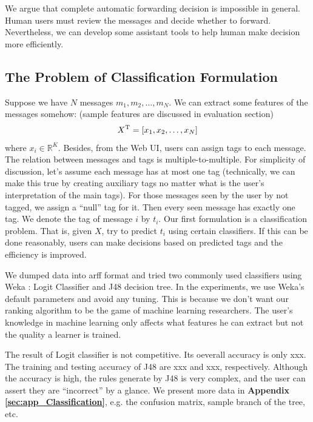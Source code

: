 \documentclass{sig-alternate}
\begin{document}
We argue that complete automatic forwarding decision is impossible in general. 
Human users must review the messages and decide whether to forward. 
Nevertheless, we can develop some assistant tools to 
help human make decision more efficiently. 


\subsection{The Problem of Classification Formulation}
\label{sec:The Problem of Classification}

Suppose we have $N$ messages $m_1, m_2, \ldots, m_N$. 
We can extract some features of the messages somehow:
(sample features are discussed in evaluation section)
\begin{equation}
	X^\mathrm{T} = [x_1, x_2, \ldots, x_N]
\end{equation}
where $x_i \in \mathbb{R}^K$. 
Besides, from the Web UI, users can assign tags to each message. 
The relation between messages and tags is multiple-to-multiple. 
For simplicity of discussion, 
let's assume each message has at most one tag
(technically, we can make this true by creating auxiliary tags no 
matter what is the user's interpretation of the main tags). 
For those messages seen by the user by not tagged, 
we assign a ``null'' tag for it. 
Then every seen message has exactly one tag. 
We denote the tag of message $i$ by $t_i$. 
Our first formulation is a classification problem. 
That is, given $X$, try to predict $t_i$ using certain classifiers. 
If this can be done reasonably, users can make decisions based 
on predicted tags and the efficiency is improved. 

We dumped data into arff format and tried two 
commonly used classifiers using Weka \cite{weka}: 
Logit Classifier and J48 decision tree. 
In the experiments, we use Weka's default parameters and avoid any tuning. 
This is because we don't want our ranking algorithm to be the game of machine learning researchers. 
The user's knowledge in machine learning only affects what features he can extract 
but not the quality a learner is trained. 

The result of Logit classifier is not competitive.
Its oeverall accuracy is only xxx. 
The training and testing accuracy of J48 are xxx and xxx, respectively. 
Although the accuracy is high, 
the rules generate by J48 is very complex, 
and the user can assert they are ``incorrect'' by a glance. 
We present more data in \textbf{Appendix \ref{sec:app_Classification}}, 
e.g. the confusion matrix, sample branch of the tree, etc. 
\end{document}
